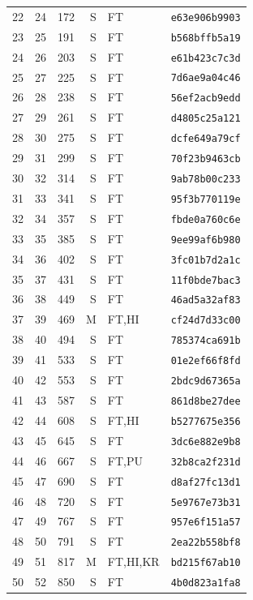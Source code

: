 \begin{longtable}{rrrrll}
22 & 24 & 172 & S & FT & \texttt{e63e906b9903} \\
23 & 25 & 191 & S & FT & \texttt{b568bffb5a19} \\
24 & 26 & 203 & S & FT & \texttt{e61b423c7c3d} \\
25 & 27 & 225 & S & FT & \texttt{7d6ae9a04c46} \\
26 & 28 & 238 & S & FT & \texttt{56ef2acb9edd} \\
27 & 29 & 261 & S & FT & \texttt{d4805c25a121} \\
28 & 30 & 275 & S & FT & \texttt{dcfe649a79cf} \\
29 & 31 & 299 & S & FT & \texttt{70f23b9463cb} \\
30 & 32 & 314 & S & FT & \texttt{9ab78b00c233} \\
31 & 33 & 341 & S & FT & \texttt{95f3b770119e} \\
32 & 34 & 357 & S & FT & \texttt{fbde0a760c6e} \\
33 & 35 & 385 & S & FT & \texttt{9ee99af6b980} \\
34 & 36 & 402 & S & FT & \texttt{3fc01b7d2a1c} \\
35 & 37 & 431 & S & FT & \texttt{11f0bde7bac3} \\
36 & 38 & 449 & S & FT & \texttt{46ad5a32af83} \\
37 & 39 & 469 & M & FT,HI & \texttt{cf24d7d33c00} \\
38 & 40 & 494 & S & FT & \texttt{785374ca691b} \\
39 & 41 & 533 & S & FT & \texttt{01e2ef66f8fd} \\
40 & 42 & 553 & S & FT & \texttt{2bdc9d67365a} \\
41 & 43 & 587 & S & FT & \texttt{861d8be27dee} \\
42 & 44 & 608 & S & FT,HI & \texttt{b5277675e356} \\
43 & 45 & 645 & S & FT & \texttt{3dc6e882e9b8} \\
44 & 46 & 667 & S & FT,PU & \texttt{32b8ca2f231d} \\
45 & 47 & 690 & S & FT & \texttt{d8af27fc13d1} \\
46 & 48 & 720 & S & FT & \texttt{5e9767e73b31} \\
47 & 49 & 767 & S & FT & \texttt{957e6f151a57} \\
48 & 50 & 791 & S & FT & \texttt{2ea22b558bf8} \\
49 & 51 & 817 & M & FT,HI,KR & \texttt{bd215f67ab10} \\
50 & 52 & 850 & S & FT & \texttt{4b0d823a1fa8} \\

\end{longtable}
